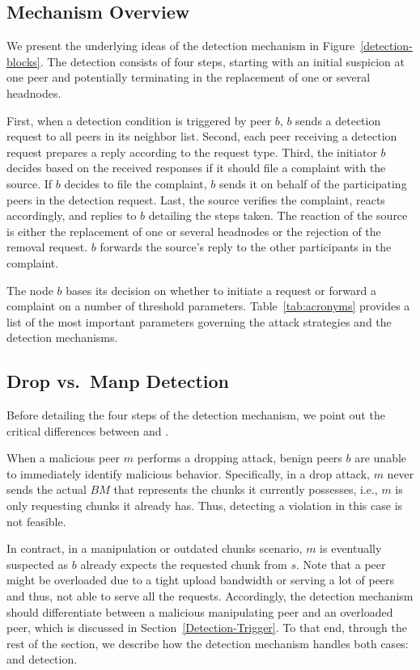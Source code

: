 \subsection{Mechanism Overview}
We present the underlying ideas of the detection mechanism in Figure~\ref{detection-blocks}.
The detection consists of four steps, starting with an initial suspicion at one peer and potentially terminating in the replacement of one or several headnodes. 

First, when a detection condition is triggered by peer $b$, $b$ sends a detection request to all peers in its neighbor list.
Second, each peer receiving a detection request prepares a reply according to the request type.
Third, the initiator $b$ decides based on the received responses if it should file a complaint with the source.
If $b$ decides to file the complaint, $b$ sends it on behalf of the participating peers in the detection request. 
Last, the source verifies the complaint, reacts accordingly, and replies to $b$ detailing the steps taken. 
The reaction of the source is either the replacement of one or several headnodes or the rejection of the removal request.
 $b$ forwards the source's reply to the other participants in the complaint.

The node $b$ bases its decision on whether to initiate a request or forward a complaint on a number of threshold
parameters. Table~\ref{tab:acronyms} provides a list of the most important parameters governing the attack strategies and
the detection mechanisms. 


\subsection{Drop vs.\ Manp Detection}
Before detailing the four steps of the detection mechanism, we point out the critical differences between \drop and \block.

When a malicious peer $m$ performs a dropping attack, benign peers $b$ are unable to immediately identify malicious behavior.
Specifically, in a drop attack, $m$ never sends the actual $BM$ that represents the chunks it currently possesses, i.e., $m$ is only requesting chunks it already has.
Thus, detecting a violation in this case is not feasible. 

In contract, in a manipulation or outdated chunks scenario, $m$ is eventually suspected as $b$ already expects the requested chunk from $s$.
Note that a peer might be overloaded due to a tight upload bandwidth or serving a lot of peers and thus, not able to serve all the requests.
Accordingly, the detection mechanism should differentiate between a malicious manipulating peer and an overloaded peer, which is discussed in Section~\ref{Detection-Trigger}.
To that end, through the rest of the section, we describe how the detection mechanism handles both cases: \drop and \block detection.

